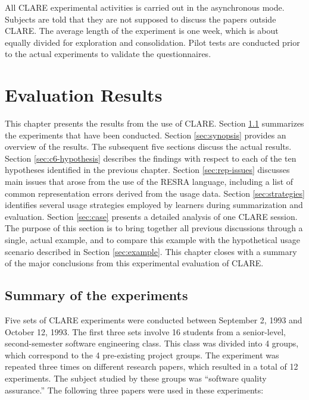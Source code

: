 All CLARE experimental activities is carried out in the asynchronous mode.
Subjects are told that they are not supposed to discuss the papers outside
CLARE. The average length of the experiment is one week, which is about
equally divided for exploration and consolidation. Pilot tests are
conducted prior to the actual experiments to validate the questionnaires.







\setcounter{chapter}{5}
\chapter{Evaluation Results}
\label{sec:results}

This chapter presents the results from the use of CLARE. Section
\ref{sec:c6-overview} summarizes the experiments that have been conducted.
Section \ref{sec:synopsis} provides an overview of the results. The
subsequent five sections discuss the actual results. Section
\ref{sec:c6-hypothesis} describes the findings with respect to each of the
ten hypotheses identified in the previous chapter.  Section
\ref{sec:rep-issues} discusses main issues that arose from the use of the
RESRA language, including a list of common representation errors derived
from the usage data. Section \ref{sec:strategies} identifies several usage
strategies employed by learners during summarization and evaluation.
Section \ref{sec:case} presents a detailed analysis of one CLARE session.
The purpose of this section is to bring together all previous discussions
through a single, actual example, and to compare this example with the
hypothetical usage scenario described in Section \ref{sec:example}. This
chapter closes with a summary of the major conclusions from this
experimental evaluation of CLARE.


\section{Summary of the experiments}
\label{sec:c6-overview}

Five sets of CLARE experiments were conducted between September 2, 1993 and
October 12, 1993. The first three sets involve 16 students from a
senior-level, second-semester software engineering class. This class was
divided into 4 groups, which correspond to the 4 pre-existing project
groups. The experiment was repeated three times on different research
papers, which resulted in a total of 12 experiments.  The subject studied
by these groups was ``software quality assurance.'' The following three
papers were used in these experiments:

